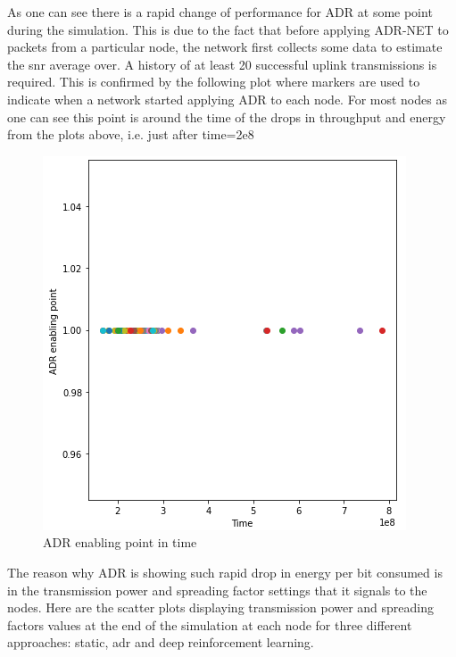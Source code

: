 As one can see there is a rapid change of performance for
ADR at some point during the simulation. This is due to
the fact that before applying ADR-NET to packets from a
particular node, the network first collects some data
to estimate the snr average over. A history of at least 20 successful uplink transmissions is required. This is 
confirmed by the following plot where markers are used 
to indicate when a network started applying ADR to each 
node. For most nodes as one can see this point is around
the time of the drops in throughput and energy from the plots above, i.e. just after time=2e8

\begin{figure}[H]
\centering
\hspace*{-0.5cm}  
\includegraphics[scale=0.50]{plots/adr/adr_enabling_point.PNG}
  \caption{ADR enabling point in time}
\end{figure}

The reason why ADR is showing such rapid drop in energy
per bit consumed is in the transmission power and 
spreading factor settings that it signals to the nodes.
Here are the scatter plots displaying transmission power and spreading factors values at the end of the simulation
at each node for three different approaches: static, adr 
and deep reinforcement learning.

